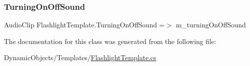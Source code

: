 \mbox{\label{class_flashlight_template_a174295af21422d85b76eb37fedb227f6}} 
\subsubsection{\texorpdfstring{Turning\+On\+Off\+Sound}{TurningOnOffSound}}
{\footnotesize\ttfamily Audio\+Clip Flashlight\+Template.\+Turning\+On\+Off\+Sound =$>$ m\+\_\+turning\+On\+Off\+Sound}



The documentation for this class was generated from the following file\+:\begin{DoxyCompactItemize}
\item 
Dynamic\+Objects/\+Templates/\mbox{\hyperlink{_flashlight_template_8cs}{Flashlight\+Template.\+cs}}\end{DoxyCompactItemize}
